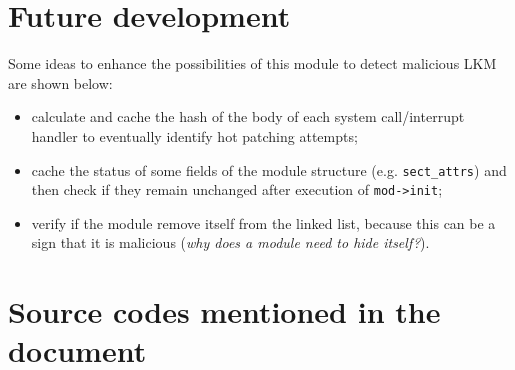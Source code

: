 \documentclass{article}
\begin{document}
	\section{Future development}
	Some ideas to enhance the possibilities of this module to detect malicious LKM are shown below:
	\begin{itemize}
		\item calculate and cache the hash of the body of each system call/interrupt handler to eventually identify hot
		patching attempts;
		\item cache the status of some fields of the module structure (e.g. \texttt{sect\_attrs}) and then check if
		they remain unchanged after execution of \texttt{mod->init};
		\item verify if the module remove itself from the linked list, because this can be a sign that it is
		malicious (\textit{why does a module need to hide itself?}).
	\end{itemize}

	\appendix
	\section{Source codes mentioned in the document}
	

	

	

	

	

	

	
\end{document}
